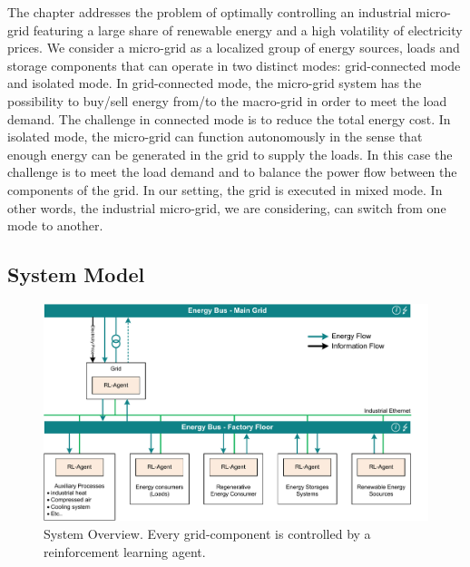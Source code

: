 The chapter addresses the problem of optimally controlling an industrial micro-grid featuring a large share of renewable energy and a high volatility of electricity prices. We consider a micro-grid as a localized group of energy sources, loads and storage components that can operate in two distinct modes: grid-connected mode and isolated mode. In grid-connected mode, the micro-grid system has the possibility to buy/sell energy from/to the macro-grid in order to meet the load demand. The challenge in connected mode is to reduce the total energy cost. In isolated mode, the micro-grid can function autonomously in the sense that enough energy can be generated in the grid to supply the loads. In this case the challenge is to meet the load demand and to balance the power flow between the components of the grid. In our setting, the grid is executed in mixed mode. In other words, the industrial micro-grid, we are considering, can switch from one mode to another.

\subsection{System Model}
\label{subsec:31}

%
\begin{figure}[b]
\includegraphics[scale=.65]{images/System_Model}
%
%
\caption{System Overview. Every grid-component is controlled by a reinforcement learning agent.}
\label{fig:system_model}       %
\end{figure}

